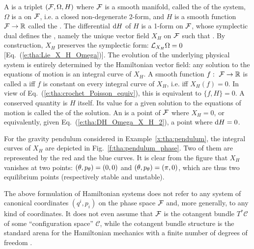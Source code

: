 \begin{prop}
\label{p:tha:Hamiltonian_system}
A 
is a triplet $(\mathcal{F},\Omega,H)$ where $\mathcal{F}$ is a smooth
manifold, called the  of the system, $\Omega$ is
a  on $\mathcal{F}$, i.e. a closed non-degenerate
2-form, and $H$ is a smooth function $\mathcal{F} \to \mathbb{R}$ called
the .
The differential $\mathrm{d} H$ of $H$ is a 1-form  on
$\mathcal{F}$, whose symplectic dual defines
the ,
namely the unique vector field $X_H$
on $\mathcal{F}$ such that
\be \label{e:tha:DH_Omega_X_H_2}
.
\ee
By construction, $X_H$ preserves the symplectic
form: $\mathcal{L}_{X_H} \Omega = 0$ [Eq.~(\ref{e:tha:Lie_X_H_Omega})].
The evolution of the underlying physical system is entirely determined
by the Hamiltonian vector field: any solution to the equations of motion
is an integral curve of $X_H$.
A smooth function $f: \ \mathcal{F} \to \mathbb{R}$ is called a
 iff $f$ is constant on every integral curve
of $X_H$, i.e. iff $X_H(f) = 0$. In view of Eq.~(\ref{e:tha:crochet_Poisson_equiv}),
this is equivalent to $\{f,H\} = 0$.
A conserved quantity is $H$ itself. Its value for a given solution to the equations of motion
is called the  of the solution.
An  is a point of $\mathcal{F}$ where $X_H = 0$,
or equivalently, given Eq.~(\ref{e:tha:DH_Omega_X_H_2}), a point where
$\mathrm{d} H = 0$.
\end{prop}

\begin{example}
For the gravity pendulum considered in Example~\ref{x:tha:pendulum},
the integral curves of $X_H$ are depicted in Fig.~\ref{f:tha:pendulum_phase}.
Two of them are
represented by the red and the blue curves. It is clear from the figure
that $X_H$ vanishes at two points: $(\theta,p_\theta) = (0,0)$ and $(\theta,p_\theta) = (\pi,0)$,
which are thus two equilibrium points (respectively stable and unstable).
\end{example}


\begin{remark}
\label{r:tha:Ham_syst_no_canonical_coord}
The above formulation of Hamiltonian systems does not
refer to any system of canonical coordinates $(q^i, p_i)$ on
the phase space $\mathcal{F}$
and, more generally, to any kind of coordinates.
It does not even assume that $\mathcal{F}$ is the cotangent bundle $T^*\mathcal{C}$
of some ``configuration space'' $\mathcal{C}$,
while the cotangent bundle structure is the standard
arena for the Hamiltonian mechanics with a finite number of degrees
of freedom \cite{AbrahM78}.
\end{remark}

